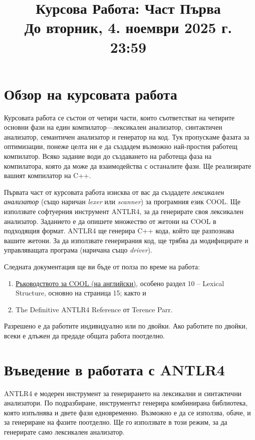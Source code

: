 \documentclass[11pt]{article}
\title{Курсова Работа: Част Първа\\До вторник, 4. ноември 2025 г. 23:59}
\author{}
\date{}
\begin{document}
\maketitle
\thispagestyle{fancy}

\section{Обзор на курсовата работа}

Курсовата работа се състои от четири части, които съответстват на четирите основни фази на един компилатор---лексикален анализатор, синтактичен анализатор, семантичен анализатор и генератор на код.
Тук пропускаме фазата за оптимизации, понеже целта ни е да създадем възможно най-простия работещ компилатор.
Всяко задание води до създаването на работеща фаза на компилатора, която да може да взаимодейства с останалите фази.
Ще реализирате вашият компилатор на C++.

Първата част от курсовата работа изисква от вас да създадете \emph{лексикален анализатор} (също наричан \emph{lexer} или \emph{scanner}) за програмния език COOL.
Ще използвате софтуерния инструмент ANTLR4, за да генерирате своя лексикален анализатор.
Заданието е да опишете множество от жетони на COOL в подходящия формат.
ANTLR4 ще генерира C++ кода, който ще разпознава вашите жетони.
За да използвате генерирания код, ще трябва да модифицирате и управляващата програма (наричана също \emph{driver}).

Следната документация ще ви бъде от полза по време на работа:

\begin{enumerate}
    \item \href{https://web.stanford.edu/class/cs143/materials/cool-manual.pdf}{Ръководството за COOL (на английски)}, особено раздел 10 -- Lexical Structure, основно на страница 15; както и
    \item The Definitive ANTLR4 Reference от Terence Parr.
\end{enumerate}

Разрешено е да работите индивидуално или по двойки. Ако работите по двойки, всеки е длъжен да предаде общата работа поотделно.

\section{Въведение в работата с ANTLR4}\label{sec:antlr4}

ANTLR4 е модерен инструмент за генерирането на лексикални и синтактични анализатори.
По подразбиране, инструментът генерира комбинирана библиотека, която изпълнява и двете фази едновременно.
Възможно е да се използва, обаче, и за генериране на фазите поотделно.
Ще го използвате в този режим, за да генерирате само лексикален анализатор.
\end{document}
